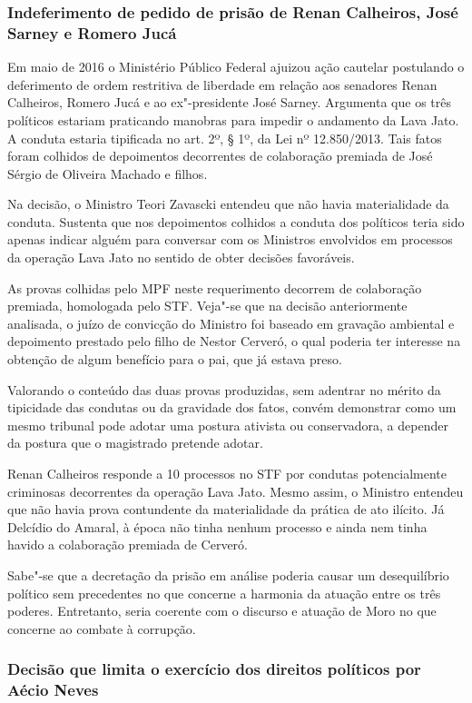 {\subsubsection{Indeferimento de pedido de prisão de Renan Calheiros,
José Sarney e Romero Jucá}

Em maio de 2016 o Ministério Público Federal ajuizou ação cautelar
postulando o deferimento de ordem restritiva de liberdade em relação aos
senadores Renan Calheiros, Romero Jucá e ao ex"-presidente José Sarney.
Argumenta que os três políticos estariam praticando manobras para
impedir o andamento da Lava Jato. A conduta estaria tipificada no art.
2º, § 1º, da Lei nº 12.850/2013. Tais fatos foram colhidos de
depoimentos decorrentes de colaboração premiada de José Sérgio de
Oliveira Machado e filhos.

Na decisão, o Ministro Teori Zavascki entendeu que não havia
materialidade da conduta. Sustenta que nos depoimentos colhidos a
conduta dos políticos teria sido apenas indicar alguém para conversar
com os Ministros envolvidos em processos da operação Lava Jato no
sentido de obter decisões favoráveis.

As provas colhidas pelo MPF neste requerimento decorrem de colaboração
premiada, homologada pelo STF. Veja"-se que na decisão anteriormente
analisada, o juízo de convicção do Ministro foi baseado em gravação
ambiental e depoimento prestado pelo filho de Nestor Cerveró, o qual
poderia ter interesse na obtenção de algum benefício para o pai, que já
estava preso.

Valorando o conteúdo das duas provas produzidas, sem adentrar no mérito
da tipicidade das condutas ou da gravidade dos fatos, convém demonstrar
como um mesmo tribunal pode adotar uma postura ativista ou conservadora,
a depender da postura que o magistrado pretende adotar.

Renan Calheiros responde a 10 processos no STF por condutas
potencialmente criminosas decorrentes da operação Lava Jato. Mesmo
assim, o Ministro entendeu que não havia prova contundente da
materialidade da prática de ato ilícito. Já Delcídio do Amaral, à época
não tinha nenhum processo e ainda nem tinha havido a colaboração
premiada de Cerveró.

Sabe"-se que a decretação da prisão em análise poderia causar um
desequilíbrio político sem precedentes no que concerne a harmonia da
atuação entre os três poderes. Entretanto, seria coerente com o discurso
e atuação de Moro no que concerne ao combate à corrupção.

\subsubsection{Decisão que limita o exercício dos direitos políticos por
Aécio Neves}

}
